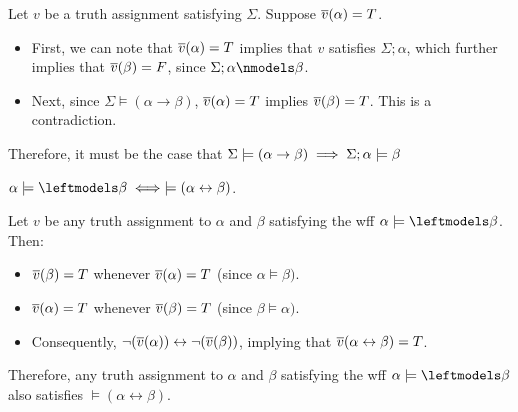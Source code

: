 \begin{problem}
\begin{enumalph}
\begin{Answer}
\begin{enumroman}
          \step
          Let $v$ be a truth assignment satisfying $\Sigma$.
          Suppose $\overline{v}(\alpha) = T$.
          \begin{itemize}
            \item First, we can note that
              $\overline{v}(\alpha) = T$ implies that $v$ satisfies $\Sigma ; \alpha$,
              which further implies that $\overline{v}(\beta) = F$, since $\Sigma ; \alpha \nmodels \beta$.
            \item Next, since $\Sigma \models (\alpha \to \beta)$,
              $\overline{v}(\alpha) = T$ implies $\overline{v}(\beta) = T$. This is a contradiction.
          \end{itemize}
        Therefore, it must be the case that $\Sigma \models (\alpha \rightarrow \beta) \implies \Sigma ; \alpha \models \beta $
      \end{enumroman}
    \end{Answer}
    \item $\alpha \models \backmodels \beta \iff \models (\alpha \leftrightarrow \beta)$.  
    \begin{Answer}
      Let $v$ be any truth assignment to $\alpha$ and $\beta$
      satisfying the wff $\alpha \models \backmodels \beta$. Then:
      \begin{itemize}
        \item $\overline{v}(\beta) = T$ whenever $\overline{v}(\alpha) = T$ (since $\alpha \models \beta)$.
        \item $\overline{v}(\alpha) = T$ whenever $\overline{v}(\beta) = T$ (since $\beta \models \alpha)$.
        \item Consequently, $\lnot (\overline{v}(\alpha)) \leftrightarrow \lnot (\overline{v}(\beta))$,
        implying that $\overline{v}(\alpha \leftrightarrow \beta) = T$.
      \end{itemize}
      Therefore, any truth assignment to $\alpha$ and $\beta$
      satisfying the wff $\alpha \models \backmodels \beta$ also satisfies
      $\models (\alpha \leftrightarrow \beta)$.
    \end{Answer}
  \end{enumalph}
\end{problem}
